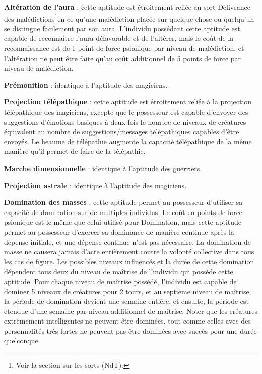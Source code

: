 \documentclass[11pt]{article}
\begin{document}
{\bigskip

\textbf{Altération de l'aura} : cette aptitude est étroitement reliée au sort Délivrance des malédictions\footnote{Voir la section sur les sorts (NdT).}en ce qu'une malédiction placée sur quelque chose ou quelqu'un se distingue facilement par son aura. L'individu possédant cette aptitude est capable de reconnaître l'aura défavorable et de l'altérer, mais le coût de la reconnaissance est de 1 point de force psionique par niveau de malédiction, et l'altération ne peut être faite qu'au coût additionnel de 5 points de force par niveau de malédiction.

\bigskip

\textbf{Prémonition} : identique à l'aptitude des magiciens.

\bigskip

\textbf{Projection télépathique} : cette aptitude est étroitement reliée à la projection télépathique des magiciens, excepté que le possesseur est capable d'envoyer des suggestions d'émotions basiques à deux fois le nombre de niveaux de créatures équivalent au nombre de suggestions/messages télépathiques capables d'être envoyés.%
Le heaume de télépathie augmente la capacité télépathique de la même manière qu'il permet de faire de la télépathie.

\bigskip

\textbf{Marche dimensionnelle} : identique à l'aptitude des guerriers.

\bigskip

\textbf{Projection astrale} : identique à l'aptitude des magiciens.

\bigskip

\textbf{Domination des masses} : cette aptitude permet au possesseur d'utiliser sa capacité de domination sur de multiples individus. Le coût en points de force psionique est le même que celui utilisé pour Domination, mais cette aptitude permet au possesseur d'exercer sa dominance de manière continue après la dépense initiale, et une dépense continue n'est pas nécessaire. La domination de masse ne causera jamais d'acte entièrement contre la volonté collective dans tous les cas de figure. Les possibles niveaux influencés et la durée de cette domination dépendent tous deux du niveau de maîtrise de l'individu qui possède cette aptitude. Pour chaque niveau de maîtrise possédé, l'individu est capable de dominer 5 niveaux de créatures pour 2 tours, et au septième niveau de maîtrise, la période de domination devient une semaine entière, et ensuite, la période est étendue d'une semaine par niveau additionnel de maîtrise. Noter que les créatures extrêmement intelligentes ne peuvent être dominées, tout comme celles avec des personnalités très fortes ne peuvent pas être dominées avec succès pour une durée quelconque.

}
\end{document}
